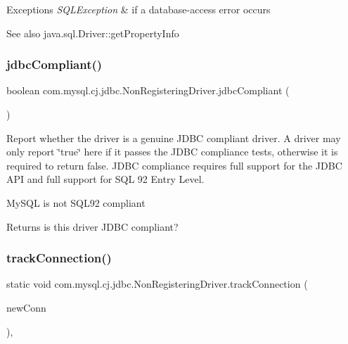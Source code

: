 \begin{DoxyExceptions}{Exceptions}
{\em S\+Q\+L\+Exception} & if a database-\/access error occurs\\
\hline
\end{DoxyExceptions}
\begin{DoxySeeAlso}{See also}
java.\+sql.\+Driver\+::get\+Property\+Info 
\end{DoxySeeAlso}
\mbox{\label{classcom_1_1mysql_1_1cj_1_1jdbc_1_1_non_registering_driver_a7957fc641b984cf8d56938949be1069d}} 
\subsubsection{\texorpdfstring{jdbc\+Compliant()}{jdbcCompliant()}}
{\footnotesize\ttfamily boolean com.\+mysql.\+cj.\+jdbc.\+Non\+Registering\+Driver.\+jdbc\+Compliant (\begin{DoxyParamCaption}{ }\end{DoxyParamCaption})}

Report whether the driver is a genuine J\+D\+BC compliant driver. A driver may only report \char`\"{}true\char`\"{} here if it passes the J\+D\+BC compliance tests, otherwise it is required to return false. J\+D\+BC compliance requires full support for the J\+D\+BC A\+PI and full support for S\+QL 92 Entry Level.

My\+S\+QL is not S\+Q\+L92 compliant 

\begin{DoxyReturn}{Returns}
is this driver J\+D\+BC compliant? 
\end{DoxyReturn}
\mbox{\label{classcom_1_1mysql_1_1cj_1_1jdbc_1_1_non_registering_driver_af5d0136e48b6fc7f86919ff737840950}} 
\subsubsection{\texorpdfstring{track\+Connection()}{trackConnection()}}
{\footnotesize\ttfamily static void com.\+mysql.\+cj.\+jdbc.\+Non\+Registering\+Driver.\+track\+Connection (\begin{DoxyParamCaption}\item[{\mbox{\hyperlink{interfacecom_1_1mysql_1_1cj_1_1jdbc_1_1_jdbc_connection}{Jdbc\+Connection}}}]{new\+Conn }\end{DoxyParamCaption})\hspace{0.3cm}{\ttfamily [static]}, {\ttfamily [protected]}}



